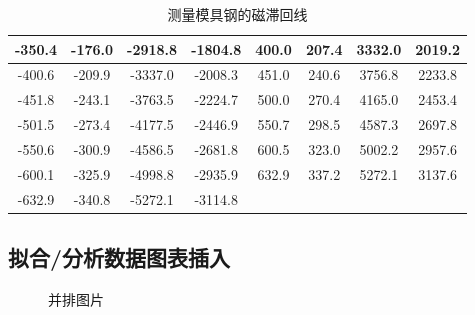 \documentclass[11pt]{article}
\begin{document}
\begin{table}[H]
\begin{tabular}{|c|c|c|c|c|c|c|c|}
        -350.4&-176.0 &-2918.8&-1804.8 & 400.0 &207.4  &3332.0 &2019.2 \\\hline
        -400.6&-209.9 &-3337.0&-2008.3 & 451.0 &240.6  &3756.8 &2233.8 \\\hline
        -451.8&-243.1 &-3763.5&-2224.7 & 500.0 &270.4  &4165.0 &2453.4 \\\hline
        -501.5&-273.4 &-4177.5&-2446.9 & 550.7 &298.5  &4587.3 &2697.8 \\\hline
        -550.6&-300.9 &-4586.5&-2681.8 & 600.5 &323.0  &5002.2 &2957.6 \\\hline
        -600.1&-325.9 &-4998.8&-2935.9 & 632.9 &337.2  &5272.1 &3137.6 \\\hline
        -632.9&-340.8 &-5272.1&-3114.8 & & & &\\\hline
    \end{tabular}
    \caption{测量模具钢的磁滞回线}
\end{table}

\subsection{拟合/分析数据图表插入}
\begin{figure}[H]
    \centering
    \hspace{0.5in}
    \hspace{0.5in}
    \caption{并排图片}
\end{figure}
\end{document}
